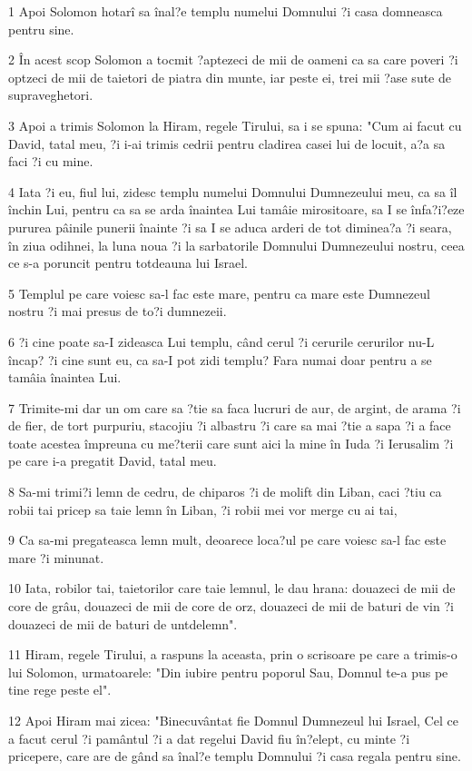 \par 1 Apoi Solomon hotarî sa înal?e templu numelui Domnului ?i casa domneasca pentru sine.
\par 2 În acest scop Solomon a tocmit ?aptezeci de mii de oameni ca sa care poveri ?i optzeci de mii de taietori de piatra din munte, iar peste ei, trei mii ?ase sute de supraveghetori.
\par 3 Apoi a trimis Solomon la Hiram, regele Tirului, sa i se spuna: "Cum ai facut cu David, tatal meu, ?i i-ai trimis cedrii pentru cladirea casei lui de locuit, a?a sa faci ?i cu mine.
\par 4 Iata ?i eu, fiul lui, zidesc templu numelui Domnului Dumnezeului meu, ca sa îl închin Lui, pentru ca sa se arda înaintea Lui tamâie mirositoare, sa I se înfa?i?eze pururea pâinile punerii înainte ?i sa I se aduca arderi de tot diminea?a ?i seara, în ziua odihnei, la luna noua ?i la sarbatorile Domnului Dumnezeului nostru, ceea ce s-a poruncit pentru totdeauna lui Israel.
\par 5 Templul pe care voiesc sa-l fac este mare, pentru ca mare este Dumnezeul nostru ?i mai presus de to?i dumnezeii.
\par 6 ?i cine poate sa-I zideasca Lui templu, când cerul ?i cerurile cerurilor nu-L încap? ?i cine sunt eu, ca sa-I pot zidi templu? Fara numai doar pentru a se tamâia înaintea Lui.
\par 7 Trimite-mi dar un om care sa ?tie sa faca lucruri de aur, de argint, de arama ?i de fier, de tort purpuriu, stacojiu ?i albastru ?i care sa mai ?tie a sapa ?i a face toate acestea împreuna cu me?terii care sunt aici la mine în Iuda ?i Ierusalim ?i pe care i-a pregatit David, tatal meu.
\par 8 Sa-mi trimi?i lemn de cedru, de chiparos ?i de molift din Liban, caci ?tiu ca robii tai pricep sa taie lemn în Liban, ?i robii mei vor merge cu ai tai,
\par 9 Ca sa-mi pregateasca lemn mult, deoarece loca?ul pe care voiesc sa-l fac este mare ?i minunat.
\par 10 Iata, robilor tai, taietorilor care taie lemnul, le dau hrana: douazeci de mii de core de grâu, douazeci de mii de core de orz, douazeci de mii de baturi de vin ?i douazeci de mii de baturi de untdelemn".
\par 11 Hiram, regele Tirului, a raspuns la aceasta, prin o scrisoare pe care a trimis-o lui Solomon, urmatoarele: "Din iubire pentru poporul Sau, Domnul te-a pus pe tine rege peste el".
\par 12 Apoi Hiram mai zicea: "Binecuvântat fie Domnul Dumnezeul lui Israel, Cel ce a facut cerul ?i pamântul ?i a dat regelui David fiu în?elept, cu minte ?i pricepere, care are de gând sa înal?e templu Domnului ?i casa regala pentru sine.
